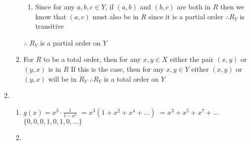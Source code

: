 \documentclass{article}
\begin{document}
\begin{enumerate}
\begin{enumerate}
\begin{enumerate}
				\item Since for any $a,b,c\in Y$, if $(a,b)$ and $(b,c)$ are both in $R$ then we know that $(a,c)$ must also be in $R$ since it is a partial order
				\newline $\therefore R_Y$ is transitive
			\end{enumerate}
			$\therefore$ $R_Y$ is a partial order on $Y$
			
			\newpage
			\item For $R$ to be a total order, then for any $x,y\in X$ either the pair $(x,y)$ or $(y,x)$ is in $R$
			\newline If this is the case, then for any $x,y\in Y$ either $(x,y)$ or $(y,x)$ will be in $R_Y$
			\newline $\therefore R_Y$ is a total order on $Y$
		\end{enumerate}
	
		\item
		\begin{enumerate}
			\item $g(x)=x^3\cdot\frac{1}{1-x^2}$
			\newline $=x^3(1+x^2+x^4+...)$
			\newline $=x^3+x^5+x^7+...$
			\newline $\{0,0,0,1,0,1,0,...\}$
			
			\item
		\end{enumerate}
		
	\end{enumerate}
\end{document}
